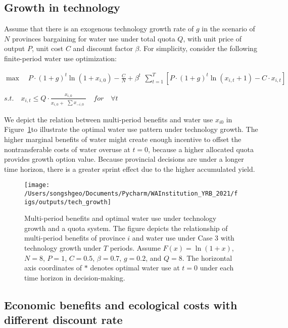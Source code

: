\documentclass{article}
\begin{document}
\subsection*{Growth in technology}

Assume that there is an exogenous technology growth rate of $g$ in the scenario of $N$ provinces bargaining for water use under total quota $Q$, with unit price of output $P$, unit cost $C$ and discount factor $\beta$.
For simplicity, consider the following finite-period water use optimization:

$ \max \quad P \cdot (1+g)^t \ln(1+x_{i,0})-\frac{C}{N}+\beta^t \begin{matrix} \sum_{t=1}^T [P \cdot (1+g)^t \ln(x_{i,t}+1)-C \cdot x_{i,t}] \end{matrix}$

$s.t. \quad x_{i,t} \leq Q \cdot \frac{x_{i,0}}{x_{i,0} + \begin{matrix} \sum x_{-i,0} \end{matrix}} \quad for \quad \forall t$

We depict the relation between multi-period benefits and water use $x_{i0}$ in Figure~\ref{fig:tech_growth}to illustrate the optimal water use pattern under technology growth.
The higher marginal benefits of water might create enough incentive to offset the nontransferable costs of water overuse at $t=0$, because a higher allocated quota provides growth option value.
Because provincial decisions are under a longer time horizon, there is a greater sprint effect due to the higher accumulated yield.

\begin{figure}[!h]
	\centering
	\texttt{[image: /Users/songshgeo/Documents/Pycharm/WAInstitution\_YRB\_2021/figs/outputs/tech\_growth]}
	\caption{Multi-period benefits and optimal water use under technology growth and a quota system. The figure depicts the relationship of multi-period benefits of province $i$ and water use under Case 3 with technology growth under $T$ periods. Assume $F(x)=\ln(1+x)$, $N=8$, $P=1$, $C=0.5$, $\beta=0.7$, $g=0.2$, and $Q=8$. The horizontal axis coordinates of $*$ denotes optimal water use at $t=0$ under each time horizon in decision-making.}
	\label{fig:tech_growth}
\end{figure}

\subsection*{Economic benefits and ecological costs with different discount rate}
\end{document}

